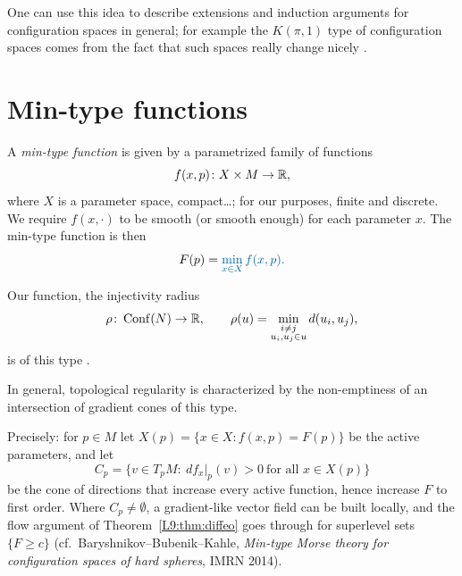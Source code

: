 One can use this idea to describe extensions and induction arguments for configuration spaces in
general; for example the $K(\pi,1)$ type of configuration spaces comes from the fact that such spaces
really change nicely .

\section{Min-type functions}
\label{L10:sec:mintype}

\begin{definition}
\label{L10:def:mintype}
A \emph{min-type function} is given by a parametrized family of functions
\[
  f(x,p)\colon X\times M\to\mathbb{R} ,
\]
where $X$ is a parameter space, compact\dots; for our purposes, finite and discrete. We require
$f(x,\cdot)$ to be smooth (or smooth enough) for each parameter $x$. The min-type function is then
\[
  F(p)=\added{\min_{x\in X}f(x,p).}
\]
\end{definition}

Our function, the injectivity radius
\[
  \rho\colon\operatorname{Conf}(N)\to\mathbb{R},\qquad \rho(u)=\min_{\substack{i\ne j\\ u_i,u_j\in u}} d(u_i,u_j),
\]
is of this type .

In general, topological regularity is characterized by the non-emptiness of an intersection of
gradient cones of this type.
\begin{addedblock}
Precisely: for $p\in M$ let $X(p)=\{x\in X: f(x,p)=F(p)\}$ be the active parameters, and let
\[
  C_p=\{v\in T_pM:\ df_x|_p(v)>0\ \text{for all } x\in X(p)\}
\]
be the cone of directions that increase every active function, hence increase $F$ to first order.
Where $C_p\ne\emptyset$, a gradient-like vector field can be built locally, and the flow argument of
Theorem~\ref{L9:thm:diffeo} goes through for superlevel sets $\{F\ge c\}$
(cf.\ Baryshnikov--Bubenik--Kahle, \emph{Min-type Morse theory for configuration spaces of hard
spheres}, IMRN 2014).
\end{addedblock}

